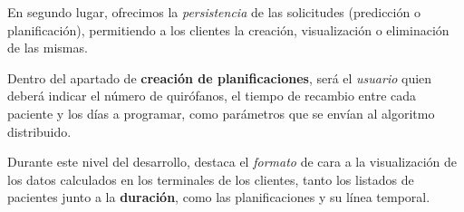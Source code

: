
En segundo lugar, ofrecimos la \textit{persistencia} de las solicitudes (predicción o planificación), permitiendo a los clientes la creación, visualización o eliminación de las mismas.

Dentro del apartado de \textbf{creación de planificaciones}, será el \textit{usuario} quien deberá indicar el número de quirófanos, el tiempo de recambio entre cada paciente y los días a programar, como parámetros que se envían al algoritmo distribuido.

Durante este nivel del desarrollo, destaca el \textit{formato} de cara a la visualización de los datos calculados en los terminales de los clientes, tanto los listados de pacientes junto a la \textbf{duración}, como las planificaciones y su línea temporal.



